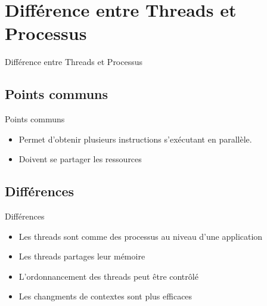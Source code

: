 \def\sectitle{Différence entre Threads et Processus}
\section{\sectitle}
\begin{frame}{\sectitle}
    \def\subsectitle{Points communs}
    \subsection{\subsectitle}
    \begin{block}{\subsectitle}
        \begin{itemize}
            \item Permet d'obtenir plusieurs instructions s'exécutant en
                parallèle.
            \item Doivent se partager les ressources
        \end{itemize}
    \end{block}

    \def\subsectitle{Différences}
    \subsection{\subsectitle}
    \begin{block}{\subsectitle}
        \begin{itemize}
            \item Les threads sont comme des processus au niveau d'une
                application
            \item Les threads partages leur mémoire
            \item L'ordonnancement des threads peut être contrôlé
            \item Les changments de contextes sont plus efficaces
        \end{itemize}
    \end{block}
\end{frame}


\def\sectitle{Comportement du threads}
